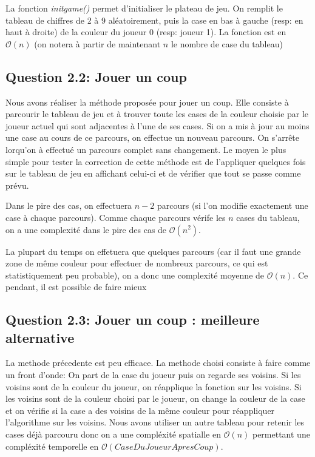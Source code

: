 \documentclass{article}
\begin{document}
La fonction \textit{initgame()} permet d'initialiser le plateau de jeu. On remplit le tableau de chiffres de 2 à 9 aléatoirement, puis la case en bas à gauche (resp: en haut à droite) de la couleur du joueur 0 (resp: joueur 1). La fonction est en $\mathcal{O}(n)$ (on notera à partir de maintenant $n$ le nombre de case du tableau)

    \subsection{Question 2.2: Jouer un coup}
    Nous avons réaliser la méthode proposée pour jouer un coup. Elle consiste à parcourir le tableau de jeu et à trouver toute les cases de la couleur choisie par le joueur actuel qui sont adjacentes à l'une de ses cases. Si on a mis à jour au moins une case au cours de ce parcours, on effectue un nouveau parcours. On s'arrête lorqu'on à effectué un parcours complet sans changement. Le moyen le plus simple pour tester la correction de cette méthode est de l'appliquer quelques fois sur le tableau de jeu en affichant celui-ci et de vérifier que tout se passe comme prévu.

    Dans le pire des cas, on effectuera $n-2$ parcours (si l'on modifie exactement une case à chaque parcours). Comme chaque parcours vérife les $n$ cases du tableau, on a une complexité dans le pire des cas de $\mathcal{O}(n^2)$.

    La plupart du temps on effetuera que quelques parcours (car il faut une grande zone de même couleur pour effectuer de nombreux parcours, ce qui est statistiquement peu probable), on a donc une complexité moyenne de $\mathcal{O}(n)$. Ce pendant, il est possible de faire mieux

    \subsection{Question 2.3: Jouer un coup : meilleure alternative}
    La methode précedente est peu efficace. La methode choisi consiste à faire comme un front d'onde: On part de la case du joueur puis on regarde ses voisins. Si les voisins sont de la couleur du joueur, on réapplique la fonction sur les voisins. Si les voisins sont de la couleur choisi par le joueur, on change la couleur de la case et on vérifie si la case a des voisins de la même couleur pour réappliquer l'algorithme sur les voisins. Nous avons utiliser un autre tableau pour retenir les cases déjà parcouru donc on a une compléxité spatialle en $\mathcal{O}(n)$ permettant une compléxité temporelle en $\mathcal{O}(CaseDuJoueurApresCoup)$.
\end{document}
